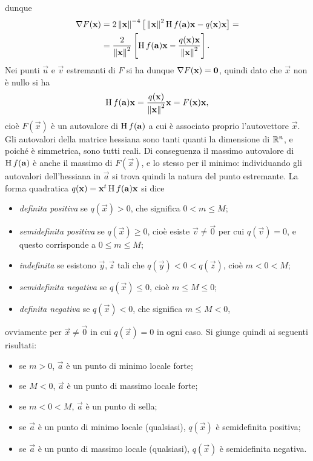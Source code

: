 dunque
\begin{equation}
\begin{split}
\nabla F(\mathbf{x})	&=2\left\|{\mathbf{x}}\right\|^{-4}\big[\left\|{\mathbf{x}}\right\|^2\operatorname{H} f(\mathbf{a})\mathbf{x}-q(\mathbf{x})\mathbf{x}\big]=\\
				&=\frac2{\left\|{\mathbf{x}}\right\|^2}\left[\operatorname{H} f(\mathbf{a})\mathbf{x}-\frac{q(\mathbf{x})\mathbf{x}}{\left\|{\mathbf{x}}\right\|^2}\right].
\end{split}
\end{equation}
Nei punti $\vec u$ e $\vec v$ estremanti di $F$ si ha dunque $\nabla F(\mathbf{x})=\mathbf{0}$, quindi dato che $\vec x$ non è nullo si ha
\begin{equation}
\operatorname{H} f(\mathbf{a})\mathbf{x}=\frac{q(\mathbf{x})}{\left\|{\mathbf{x}}\right\|^2}\mathbf{x}=F(\mathbf{x})\mathbf{x},
\end{equation}
cioè $F(\vec x)$ è un autovalore di $\operatorname{H} f(\mathbf{a})$ a cui è associato proprio l'autovettore $\vec x$. Gli autovalori della matrice hessiana sono tanti quanti la dimensione di $\mathbb{R}^n$, e poiché è simmetrica, sono tutti reali.
Di conseguenza il massimo autovalore di $\operatorname{H} f(\mathbf{a})$ è anche il massimo di $F(\vec x)$, e lo stesso per il minimo: individuando gli autovalori dell'hessiana in $\vec a$ si trova quindi la natura del punto estremante.
La forma quadratica $q(\mathbf{x})=\mathbf{x}^t\operatorname{H} f(\mathbf{a})\mathbf{x}$ si dice
\begin{itemize}
\item\emph{definita positiva} se $q(\vec x)>0$, che significa $0<m\leq M$;
\item\emph{semidefinita positiva} se $q(\vec x)\geq 0$, cioè esiste $\vec v\neq\vec 0$ per cui $q(\vec v)=0$, e questo corrisponde a $0\leq m\leq M$;
\item\emph{indefinita} se esistono $\vec y,\vec z$ tali che $q(\vec y)<0<q(\vec z)$, cioè $m<0<M$;
\item\emph{semidefinita negativa} se $q(\vec x)\leq 0$, cioè $m\leq M\leq 0$;
\item\emph{definita negativa} se $q(\vec x)<0$, che significa $m\leq M<0$,
\end{itemize}
ovviamente per $\vec x\neq\vec 0$ in cui $q(\vec x)=0$ in ogni caso.
Si giunge quindi ai seguenti risultati:
\begin{itemize}
\item se $m>0$, $\vec a$ è un punto di minimo locale forte;
\item se $M<0$, $\vec a$ è un punto di massimo locale forte;
\item se $m<0<M$, $\vec a$ è un punto di sella;
\item se $\vec a$ è un punto di minimo locale (qualsiasi), $q(\vec x)$ è semidefinita positiva;
\item se $\vec a$ è un punto di massimo locale (qualsiasi), $q(\vec x)$ è semidefinita negativa.
\end{itemize}
